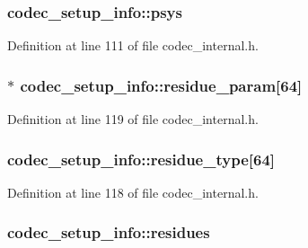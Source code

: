 \subsubsection[{\texorpdfstring{psys}{psys}}]{ codec\+\_\+setup\+\_\+info\+::psys}\hypertarget{structcodec__setup__info_a0ff85713fe3d4d57b0fe0acd86764e6e}{}\label{structcodec__setup__info_a0ff85713fe3d4d57b0fe0acd86764e6e}


Definition at line 111 of file codec\+\_\+internal.\+h.

\subsubsection[{\texorpdfstring{residue\+\_\+param}{residue_param}}]{$\ast$ codec\+\_\+setup\+\_\+info\+::residue\+\_\+param\mbox{[}64\mbox{]}}\hypertarget{structcodec__setup__info_a1f815302d7363e9ac93f84fb8cd186c4}{}\label{structcodec__setup__info_a1f815302d7363e9ac93f84fb8cd186c4}


Definition at line 119 of file codec\+\_\+internal.\+h.

\subsubsection[{\texorpdfstring{residue\+\_\+type}{residue_type}}]{ codec\+\_\+setup\+\_\+info\+::residue\+\_\+type\mbox{[}64\mbox{]}}\hypertarget{structcodec__setup__info_a47b8090556fae1648803a10d58717235}{}\label{structcodec__setup__info_a47b8090556fae1648803a10d58717235}


Definition at line 118 of file codec\+\_\+internal.\+h.

\subsubsection[{\texorpdfstring{residues}{residues}}]{ codec\+\_\+setup\+\_\+info\+::residues}\hypertarget{structcodec__setup__info_af730d6d8181fb830badaf26b6b688afb}{}\label{structcodec__setup__info_af730d6d8181fb830badaf26b6b688afb}


